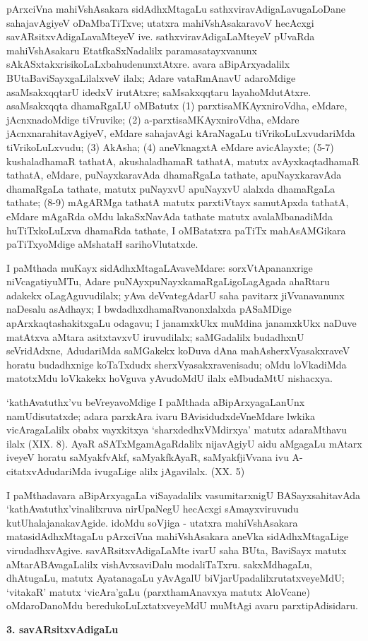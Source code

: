 pArxciVna mahiVshAsakara sidAdhxMtagaLu sathxviravAdigaLavugaLoDane sahajavAgiyeV oDaMbaTiTxve; utatxra mahiVshAsakaravoV hecAcxgi savARsitxvAdigaLavaMteyeV ive. sathxvira\-vAdigaLaMteyeV pUvaRda mahiVshAsakaru EtatfkaSxNadalilx paramasatayxvanunx sAkASxtakxrisi\-koLaLxbahudenunxtAtxre. avara aBipArxyadalilx BUtaBaviSayxgaLilalxveV ilalx; Adare vataR\-mAnavU adaroMdige asaMsakxqqtarU idedxV irutAtxre; saMsakxqqtaru layahoMdutAtxre. asaMsakxqqta dhamaRgaLU oMBatutx
(1) parxtisaMKAyxniroVdha, eMdare, jAcnxnadoMdige tiVruvike;
(2) a-parxtisaMKAyxniroVdha, eMdare jAcnxnarahitavAgiyeV, eMdare sahaja\-vAgi kAraNagaLu tiVrikoLuLxvudariMda tiVrikoLuLxvudu;
(3) AkAsha;
(4) \hbox{aneVknagxtA} eMdare avicAlayxte;
(5-7) kushaladhamaR tathatA, akushaladhamaR tathatA, matutx avAyx\-kaqta\-dhamaR tathatA, eMdare, puNayxkaravAda dhamaRgaLa tathate, apuNayxkaravAda dhamaR\-gaLa tathate, matutx puNayxvU apuNayxvU alalxda dhamaRgaLa tathate; 
(8-9) \hbox{mAgARMga} tathatA matutx parxtiVtayx samutApxda tathatA, eMdare mAgaRda oMdu lakaSxNavAda tathate matutx avalaMbanadiMda huTiTxkoLuLxva dhamaRda tathate, I oMBatatxra paTiTx mahAsAMGi\-kara paTiTxyoMdige aMshataH sarihoVlutatxde.

I paMthada muKayx sidAdhxMtagaLAvaveMdare: sorxVtApananxrige niVcagatiyuMTu, Adare puNAyxpuNayxkamaRgaLigoLagAgada ahaRtaru adakekx oLagAguvudilalx; yAva deVvategAdarU saha pavitarx jiVvanavanunx naDesalu asAdhayx; I bwdadhxdhamaRvanonxlalxda pASaMDige apArxkaqtashakitxgaLu odagavu; I janamxkUkx muMdina janamxkUkx naDuve matAtxva aMtara asitxtavxvU iruvudilalx; saMGadalilx budadhxnU seVridAdxne, AdudariMda saMGakekx koDuva dAna mahAsherxVyasakxraveV horatu budadhxnige koTaTxdudx sherxVyasakxravenisadu; oMdu loVkadiMda matotxMdu loVkakekx hoVguva yAvudoMdU ilalx eMbu\-daMtU nishacxya.

`kathAvatuthx'vu beVreyavoMdige I paMthada aBipArxyagaLanUnx namUdisutatxde; adara parxkAra ivaru BAvisidudxdeVneMdare lwkika vicAragaLalilx obabx vayxkitxya `sharxdedhxVM\-dirxya' matutx adaraMthavu ilalx {\rm (XIX. 8)}. AyaR aSATxMgamAgaRdalilx nija\-vAgiyU aidu aMgagaLu mAtarx iveyeV horatu saMyakfvAkf, saMyakfkAyaR, saMyakf\-jiVvana ivu A-citatxvAdudariMda ivugaLige alilx jAgavilalx. {\rm (XX. 5)}

I paMthadavara aBipArxyagaLa viSayadalilx vasumitarxnigU BASayxsahitavAda `kathAvatuthx'vinalilxruva nirUpaNegU hecAcxgi sAmayxviruvudu kutUhalajanakavAgide. idoMdu soVjiga - utatxra mahiVshAsakara matasidAdhxMtagaLu pArxciVna mahiVshAsakara aneVka sidAdhxMtagaLige virudadhxvAgive. savARsitxvAdigaLaMte ivarU saha BUta, BaviSayx matutx aMtarABAvagaLalilx vishAvxsaviDalu modaliTaTxru. sakxMdhagaLu, dhAtugaLu, matutx AyatanagaLu yAvAgalU biVjarUpadalilxrutatxveyeMdU; `vitakaR' matutx `vicAra'gaLu (parxthamAnavxya matutx AloVcane) oMdaroDanoMdu beredukoLuLxtatxveyeMdU muMtAgi avaru parxtipAdisidaru.
\begin{center}
{\textbf{\Large 3. savARsitxvAdigaLu}}
\end{center}

